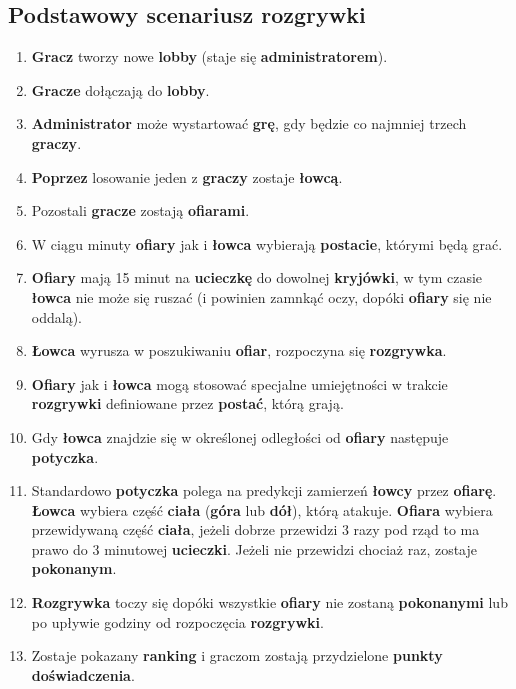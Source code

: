 \documentclass[a4paper,11pt,notitlepage]{article}
\begin{document}
\subsection{Podstawowy scenariusz rozgrywki}
\begin{enumerate}
\item
	\textbf{Gracz} tworzy nowe \textbf{lobby} (staje się \textbf{administratorem}).
	
\item
	\textbf{Gracze} dołączają do \textbf{lobby}.
	
\item
	\textbf{Administrator} może wystartować \textbf{grę}, gdy będzie co najmniej trzech \textbf{graczy}.
	
\item
	\textbf{Poprzez} losowanie jeden z \textbf{graczy} zostaje \textbf{łowcą}.
	
\item
	Pozostali \textbf{gracze} zostają \textbf{ofiarami}.
	
\item
	W ciągu minuty \textbf{ofiary} jak i \textbf{łowca} wybierają \textbf{postacie}, którymi będą grać.
	
\item
	\textbf{Ofiary} mają 15 minut na \textbf{ucieczkę} do dowolnej \textbf{kryjówki}, w tym czasie \textbf{łowca} nie może się ruszać (i powinien zamnkąć oczy, dopóki \textbf{ofiary} się nie oddalą).
	
\item
	\textbf{Łowca} wyrusza w poszukiwaniu \textbf{ofiar}, rozpoczyna się \textbf{rozgrywka}.
	
\item
	\textbf{Ofiary} jak i \textbf{łowca} mogą stosować specjalne umiejętności w trakcie \textbf{rozgrywki} definiowane przez \textbf{postać}, którą grają.
	
\item
	Gdy \textbf{łowca} znajdzie się w określonej odległości od \textbf{ofiary} następuje \textbf{potyczka}.
	
\item
	Standardowo \textbf{potyczka} polega na predykcji zamierzeń \textbf{łowcy} przez \textbf{ofiarę}. \textbf{Łowca} wybiera część \textbf{ciała} (\textbf{góra} lub \textbf{dół}), którą atakuje. \textbf{Ofiara} wybiera przewidywaną część \textbf{ciała}, jeżeli dobrze przewidzi 3 razy pod rząd to ma prawo do 3 minutowej \textbf{ucieczki}. Jeżeli nie przewidzi chociaż raz, zostaje \textbf{pokonanym}.
	
\item
	\textbf{Rozgrywka} toczy się dopóki wszystkie \textbf{ofiary} nie zostaną \textbf{pokonanymi} lub po upływie godziny od rozpoczęcia \textbf{rozgrywki}.
	
\item
	Zostaje pokazany \textbf{ranking} i graczom zostają przydzielone \textbf{punkty doświadczenia}.

	
\end{enumerate}
\end{document}
